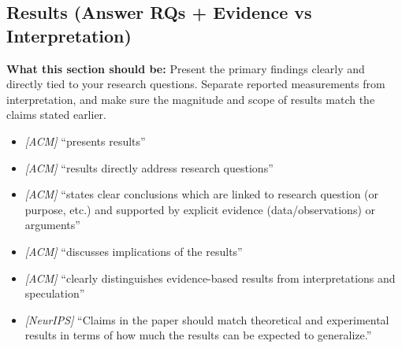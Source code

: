 \documentclass[11pt]{article}
\begin{document}
\subsection{Results (Answer RQs + Evidence vs Interpretation)}
\noindent\textbf{What this section should be:}
Present the primary findings clearly and directly tied to your research questions. Separate reported measurements from interpretation, and make sure the magnitude and scope of results match the claims stated earlier.
\begin{itemize}
  \item \textit{[ACM]} ``presents results''
  \item \textit{[ACM]} ``results directly address research questions''
  \item \textit{[ACM]} ``states clear conclusions which are linked to research question (or purpose, etc.) and supported by explicit evidence (data/observations) or arguments''
  \item \textit{[ACM]} ``discusses implications of the results''
  \item \textit{[ACM]} ``clearly distinguishes evidence-based results from interpretations and speculation''
  \item \textit{[NeurIPS]} ``Claims in the paper should match theoretical and experimental results in terms of how much the results can be expected to generalize.''
\end{itemize}
\end{document}
